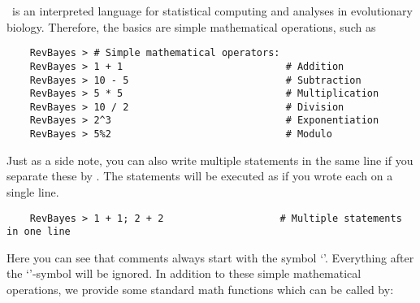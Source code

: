 \Rev~is an interpreted language for statistical computing and analyses in evolutionary biology. Therefore, the basics are simple mathematical operations, such as 
{\tt \begin{snugshade*}
\begin{lstlisting}    
    RevBayes > # Simple mathematical operators:
    RevBayes > 1 + 1                            # Addition
    RevBayes > 10 - 5                           # Subtraction
    RevBayes > 5 * 5                            # Multiplication
    RevBayes > 10 / 2                           # Division
    RevBayes > 2^3                              # Exponentiation
    RevBayes > 5%2                              # Modulo
\end{lstlisting}
\end{snugshade*}}
Just as a side note, you can also write multiple statements in the same line if you separate these by \cl{;}.
The statements will be executed as if you wrote each on a single line.
{\tt \begin{snugshade*}
\begin{lstlisting}    
    RevBayes > 1 + 1; 2 + 2                    # Multiple statements in one line
\end{lstlisting}
\end{snugshade*}}
    
Here you can see that comments always start with the symbol `\cl{\#}'. 
Everything after the `\cl{\#}'-symbol will be ignored.
In addition to these simple mathematical operations, we provide some standard math functions which can be called by:
    
